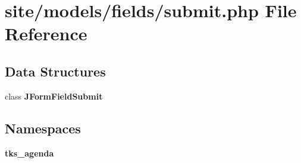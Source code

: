 \section{site/models/fields/submit.php File Reference}
\label{submit_8php}
\subsection*{Data Structures}
\begin{DoxyCompactItemize}
\item 
class \textbf{ J\+Form\+Field\+Submit}
\end{DoxyCompactItemize}
\subsection*{Namespaces}
\begin{DoxyCompactItemize}
\item 
 \textbf{ tks\+\_\+agenda}
\end{DoxyCompactItemize}
